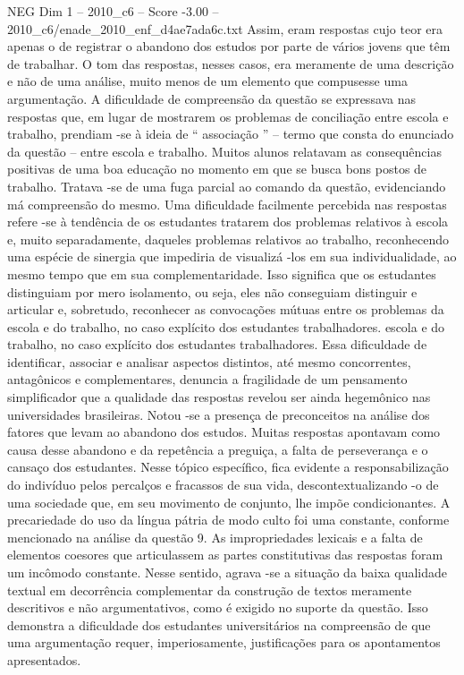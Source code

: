 \begin{textsample}{NEG Dim 1 – 2010\_c6 – Score -3.00 – 2010\_c6/enade\_2010\_enf\_d4ae7ada6c.txt}
Assim, eram respostas cujo teor era apenas o de registrar o abandono dos estudos por parte de vários jovens que têm de trabalhar.
O tom das respostas, nesses casos, era meramente de uma descrição e não de uma análise, muito menos de um elemento que compusesse uma argumentação.
A dificuldade de compreensão da questão se expressava nas respostas que, em lugar de mostrarem os problemas de conciliação entre escola e trabalho, prendiam -se à ideia de “ associação ” – termo que consta do enunciado da questão – entre escola e trabalho.
Muitos alunos relatavam as consequências positivas de uma boa educação no momento em que se busca bons postos de trabalho.
Tratava -se de uma fuga parcial ao comando da questão, evidenciando má compreensão do mesmo.
Uma dificuldade facilmente percebida nas respostas refere -se à tendência de os estudantes tratarem dos problemas relativos à escola e, muito separadamente, daqueles problemas relativos ao trabalho, reconhecendo uma espécie de sinergia que impediria de visualizá -los em sua individualidade, ao mesmo tempo que em sua complementaridade.
Isso significa que os estudantes distinguiam por mero isolamento, ou seja, eles não conseguiam distinguir e articular e, sobretudo, reconhecer as convocações mútuas entre os problemas da escola e do trabalho, no caso explícito dos estudantes trabalhadores. escola e do trabalho, no caso explícito dos estudantes trabalhadores.
Essa dificuldade de identificar, associar e analisar aspectos distintos, até mesmo concorrentes, antagônicos e complementares, denuncia a fragilidade de um pensamento simplificador que a qualidade das respostas revelou ser ainda hegemônico nas universidades brasileiras.
Notou -se a presença de preconceitos na análise dos fatores que levam ao abandono dos estudos.
Muitas respostas apontavam como causa desse abandono e da repetência a preguiça, a falta de perseverança e o cansaço dos estudantes.
Nesse tópico específico, fica evidente a responsabilização do indivíduo pelos percalços e fracassos de sua vida, descontextualizando -o de uma sociedade que, em seu movimento de conjunto, lhe impõe condicionantes.
A precariedade do uso da língua pátria de modo culto foi uma constante, conforme mencionado na análise da questão 9.
As impropriedades lexicais e a falta de elementos coesores que articulassem as partes constitutivas das respostas foram um incômodo constante.
Nesse sentido, agrava -se a situação da baixa qualidade textual em decorrência complementar da construção de textos meramente descritivos e não argumentativos, como é exigido no suporte da questão.
Isso demonstra a dificuldade dos estudantes universitários na compreensão de que uma argumentação requer, imperiosamente, justificações para os apontamentos apresentados.

\end{textsample}
